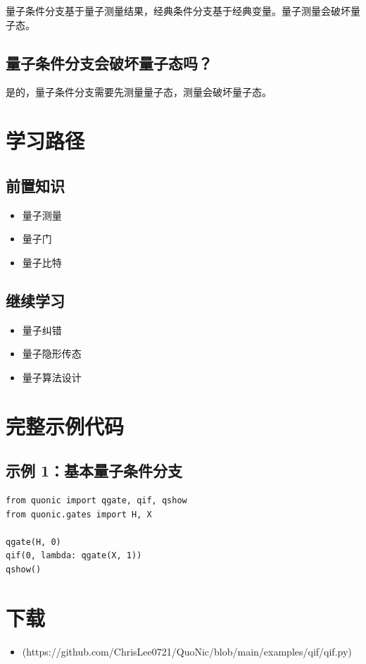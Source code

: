 \documentclass[12pt,a4paper]{article}
\begin{document}
量子条件分支基于量子测量结果，经典条件分支基于经典变量。量子测量会破坏量子态。

\subsection{量子条件分支会破坏量子态吗？}

是的，量子条件分支需要先测量量子态，测量会破坏量子态。

\section{学习路径}

\subsection{前置知识}
\begin{itemize}
  \item 量子测量
  \item 量子门
  \item 量子比特
\end{itemize}

\subsection{继续学习}
\begin{itemize}
  \item 量子纠错
  \item 量子隐形传态
  \item 量子算法设计
\end{itemize}

\section{完整示例代码}

\subsection{示例 1：基本量子条件分支}

\begin{verbatim}
from quonic import qgate, qif, qshow
from quonic.gates import H, X

qgate(H, 0)
qif(0, lambda: qgate(X, 1))
qshow()
\end{verbatim}

\section{下载}

\begin{itemize}
  \item [qif.py](https://github.com/ChrisLee0721/QuoNic/blob/main/examples/qif/qif.py)
\end{itemize}
\end{document}
